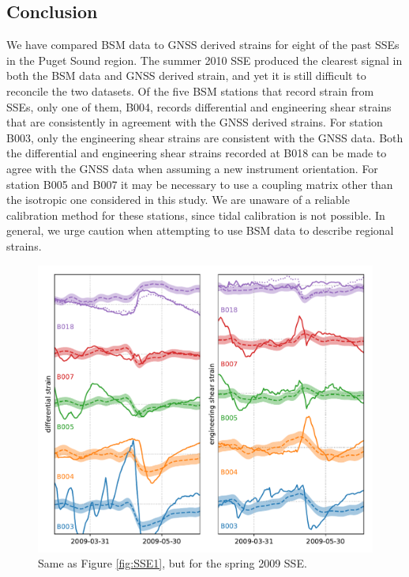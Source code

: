 \subsection{Conclusion}
We have compared BSM data to GNSS derived strains for eight of the
past SSEs in the Puget Sound region. The summer 2010 SSE produced the
clearest signal in both the BSM data and GNSS derived strain, and yet
it is still difficult to reconcile the two datasets. Of the five BSM
stations that record strain from SSEs, only one of them, B004, records
differential and engineering shear strains that are consistently in
agreement with the GNSS derived strains. For station B003, only the
engineering shear strains are consistent with the GNSS data. Both the
differential and engineering shear strains recorded at B018 can be
made to agree with the GNSS data when assuming a new instrument
orientation. For station B005 and B007 it may be necessary to use a
coupling matrix other than the isotropic one considered in this study.
We are unaware of a reliable calibration method for these stations,
since tidal calibration is not possible. In general, we urge caution
when attempting to use BSM data to describe regional strains.

%
%  
 
\begin{figure}
\includegraphics{ch5/appendix_figures/SSE0.pdf}
\caption{Same as Figure \ref{fig:SSE1}, but for the spring 2009 SSE.}   
\label{fig:SSE0}
\end{figure}

